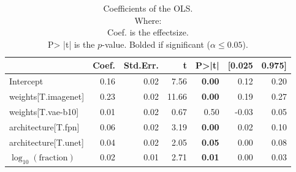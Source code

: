 \begin{table}
    \centering
    \caption{Coefficients of the OLS.\\Where:\\\hphantom{tabb}Coef. is the effectsize.\\\hphantom{tabb}P> |t| is the $p$-value. Bolded if significant ($\alpha\leq0.05$).}
    \label{tab:data_fraction_parameter_influence}
    \begin{tabular}{lrrrrrr}
        \toprule
                                     & Coef. & Std.Err. & t     & P>|t|         & [0.025 & 0.975] \\
        \midrule
        Intercept                    & 0.16  & 0.02     & 7.56  & \textbf{0.00} & 0.12   & 0.20   \\
        weights[T.imagenet]          & 0.23  & 0.02     & 11.66 & \textbf{0.00} & 0.19   & 0.27   \\
        weights[T.vae-b10]           & 0.01  & 0.02     & 0.67  & 0.50          & -0.03  & 0.05   \\
        architecture[T.fpn]          & 0.06  & 0.02     & 3.19  & \textbf{0.00} & 0.02   & 0.10   \\
        architecture[T.unet]         & 0.04  & 0.02     & 2.05  & \textbf{0.05} & 0.00   & 0.08   \\
        $\log_{10}(\text{fraction})$ & 0.02  & 0.01     & 2.71  & \textbf{0.01} & 0.00   & 0.03   \\
        \bottomrule
    \end{tabular}
\end{table}
